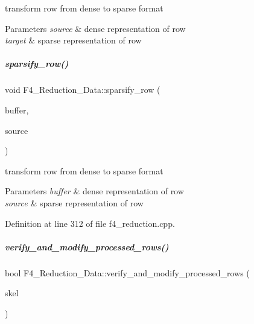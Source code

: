 transform row from dense to sparse format 


\begin{DoxyParams}{Parameters}
{\em source} & dense representation of row \\
\hline
{\em target} & sparse representation of row \\
\hline
\end{DoxyParams}
\mbox{\label{group___g_b_computation_abe5aa71d1578c175bc8d7355ed5f93fa}} 
\subparagraph{\texorpdfstring{sparsify\+\_\+row()}{sparsify\_row()}\hspace{0.1cm}{\footnotesize\ttfamily [2/2]}}
{\footnotesize\ttfamily void F4\+\_\+\+Reduction\+\_\+\+Data\+::sparsify\+\_\+row (\begin{DoxyParamCaption}\item[{const vector$<$ C\+O\+E\+F\+\_\+\+T\+Y\+PE $>$ \&}]{buffer,  }\item[{vector$<$ pair$<$ unsigned, C\+O\+E\+F\+\_\+\+T\+Y\+PE $>$ $>$ \&}]{source }\end{DoxyParamCaption})\hspace{0.3cm}{\ttfamily [protected]}}



transform row from dense to sparse format 


\begin{DoxyParams}{Parameters}
{\em buffer} & dense representation of row \\
\hline
{\em source} & sparse representation of row \\
\hline
\end{DoxyParams}


Definition at line 312 of file f4\+\_\+reduction.\+cpp.

\mbox{\label{group___g_b_computation_ad9808f644164e01195a2bcca7c3ca787}} 
\subparagraph{\texorpdfstring{verify\+\_\+and\+\_\+modify\+\_\+processed\+\_\+rows()}{verify\_and\_modify\_processed\_rows()}}
{\footnotesize\ttfamily bool F4\+\_\+\+Reduction\+\_\+\+Data\+::verify\+\_\+and\+\_\+modify\+\_\+processed\+\_\+rows (\begin{DoxyParamCaption}\item[{\hyperlink{group___c_l_s_solvers_class_l_p___solvers_1_1_l_p___solver}{L\+P\+\_\+\+Solver} $\ast$}]{skel }\end{DoxyParamCaption})}



